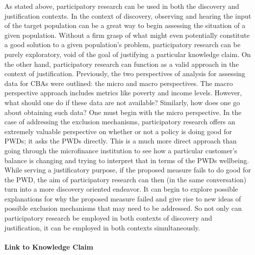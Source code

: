 \documentclass[a4paper]{article}
\begin{document}
As stated above, participatory research can be used in both the discovery and
justification contexts. In the context of discovery, observing and hearing the
input of the target population can be a great way to begin assessing the
situation of a given population. Without a firm grasp of what might even
potentially constitute a good solution to a given population's problem,
participatory research can be purely exploratory, void of the goal of
justifying a particular knowledge claim. On the other hand, participatory
research can function as a valid approach in the context of justification.
Previously, the two perspectives of analysis for assessing data for CBAs were
outlined: the micro and macro perspectives. The macro perspective approach
includes metrics like poverty and income levels. However, what should one do
if these data are not available? Similarly, how does one go about obtaining
such data? One must begin with the micro perspective. In the case of
addressing the exclusion mechanisms, participatory research offers an
extremely valuable perspective on whether or not a policy is doing good for
PWDs; it asks the PWDs directly. This is a much more direct approach than
going through the microfinance institution to see how a particular customer's
balance is changing and trying to interpret that in terms of the PWDs
wellbeing. While serving a justificatory purpose, if the proposed measure
fails to do good for the PWD, the aim of participatory research can then (in
the same conversation) turn into a more discovery oriented endeavor. It can
begin to explore possible explanations for why the proposed measure failed and
give rise to new ideas of possible exclusion mechanisms that may need to be
addressed. So not only can participatory research be employed in both contexts
of discovery and justification, it can be employed in both contexts
simultaneously.


\paragraph{Link to Knowledge Claim}
\end{document}
